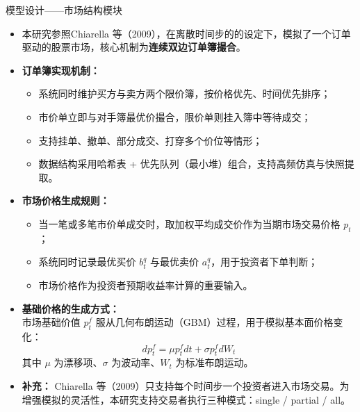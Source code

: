 \begin{frame}{模型设计——市场结构模块}

    \footnotesize
    \setlength{\parskip}{0.2em}
    \linespread{0.9}
    
    \begin{itemize}
        \item 本研究参照Chiarella 等（2009），在离散时间步的的设定下，模拟了一个订单驱动的股票市场，核心机制为\textbf{连续双边订单簿撮合}。
    
        \item \textbf{订单簿实现机制：}
        \begin{itemize}
            \item 系统同时维护买方与卖方两个限价簿，按价格优先、时间优先排序；
            \item 市价单立即与对手簿最优价撮合，限价单则挂入簿中等待成交；
            \item 支持挂单、撤单、部分成交、打穿多个价位等情形；
            \item 数据结构采用哈希表 + 优先队列（最小堆）组合，支持高频仿真与快照提取。
        \end{itemize}
    
        \item \textbf{市场价格生成规则：}
        \begin{itemize}
            \item 当一笔或多笔市价单成交时，取加权平均成交价作为当期市场交易价格 \( p_t \)；
            \item 系统同时记录最优买价 \( b_t^q \) 与最优卖价 \( a_t^q \)，用于投资者下单判断；
            \item 市场价格作为投资者预期收益率计算的重要输入。
        \end{itemize}
    
        \item \textbf{基础价格的生成方式：} \\
        市场基础价值 \( p_t^f \) 服从几何布朗运动（GBM）过程，用于模拟基本面价格变化：
        $$
        dp_t^f = \mu p_t^f dt + \sigma p_t^f dW_t
        $$
        其中 \( \mu \) 为漂移项、\( \sigma \) 为波动率、\( W_t \) 为标准布朗运动。
    
        \item \textbf{补充：} Chiarella 等（2009）只支持每个时间步一个投资者进入市场交易。为增强模拟的灵活性，本研究支持交易者执行三种模式：single / partial / all。
    
    \end{itemize}
    
    \end{frame}



